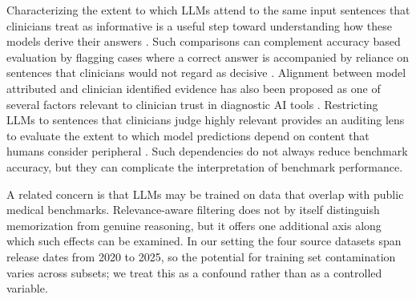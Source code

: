 \documentclass[fleqn,10pt]{wlscirep}
\begin{document}
Characterizing the extent to which LLMs attend to the same input sentences that clinicians treat as informative is a useful step toward understanding how these models derive their answers \cite{strong_chatbot_2023, katz_gpt_2024}. Such comparisons can complement accuracy based evaluation by flagging cases where a correct answer is accompanied by reliance on sentences that clinicians would not regard as decisive \cite{chiang_can_2023, McCoy_NEJM_SCTBenchmark}. Alignment between model attributed and clinician identified evidence has also been proposed as one of several factors relevant to clinician trust in diagnostic AI tools \cite{huang2025trustworthiness, huang2026probellm}. Restricting LLMs to sentences that clinicians judge highly relevant provides an auditing lens to evaluate the extent to which model predictions depend on content that humans consider peripheral \cite{zhou_explainable_2025, wu_medreason_2025, bansal_does_2021}. Such dependencies do not always reduce benchmark accuracy, but they can complicate the interpretation of benchmark performance.

A related concern is that LLMs may be trained on data that overlap with public medical benchmarks. Relevance-aware filtering does not by itself distinguish memorization from genuine reasoning, but it offers one additional axis along which such effects can be examined. In our setting the four source datasets span release dates from 2020 to 2025, so the potential for training set contamination varies across subsets; we treat this as a confound rather than as a controlled variable.
\end{document}
